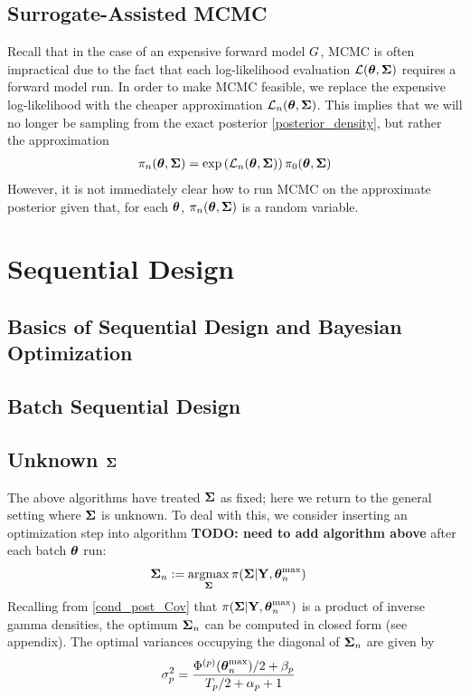 \documentclass[12pt]{article}
\begin{document}
\subsection{Surrogate-Assisted MCMC}
Recall that in the case of an expensive forward model $G$, MCMC is often impractical due to the fact that each log-likelihood evaluation $\mathcal{L}(\boldsymbol{\theta}, \boldsymbol{\Sigma})$ requires a forward model 
 run. In order to make MCMC feasible, we replace the expensive log-likelihood with the cheaper approximation $\mathcal{L}_{n}(\boldsymbol{\theta}, \boldsymbol{\Sigma})$. This implies that we will no longer be 
 sampling from the exact posterior \ref{posterior_density}, but rather the approximation
 \begin{align}
 \pi_{n}(\boldsymbol{\theta}, \boldsymbol{\Sigma}) = \exp\left(\mathcal{L}_{n}(\boldsymbol{\theta}, \boldsymbol{\Sigma})\right)\pi_0(\boldsymbol{\theta}, \boldsymbol{\Sigma}) \label{approx_posterior_density}
 \end{align}
 However, it is not immediately clear how to run MCMC on the approximate posterior given that, for each $\boldsymbol{\theta}$,  $\pi_{n}(\boldsymbol{\theta}, \boldsymbol{\Sigma})$ is a random variable. 

\section{Sequential Design}

\subsection{Basics of Sequential Design and Bayesian Optimization}

\subsection{Batch Sequential Design}

\subsection{Unknown $\boldsymbol{\Sigma}$}
The above algorithms have treated $\boldsymbol{\Sigma}$ as fixed; here we return to the general setting where $\boldsymbol{\Sigma}$ is unknown. To deal with this, we consider inserting an 
optimization step into algorithm \textbf{TODO: need to add algorithm above} after each batch $\boldsymbol{\theta}$ run:
\begin{align}
\boldsymbol{\Sigma}_{n} &:= \operatorname*{argmax}_{\boldsymbol{\Sigma}} \pi(\boldsymbol{\Sigma}|\mathbf{Y}, \boldsymbol{\theta}_{n}^{\text{max}}) \label{Cov_optimization}
\end{align}
Recalling from \ref{cond_post_Cov} that $\pi(\boldsymbol{\Sigma}|\mathbf{Y}, \boldsymbol{\theta}_{n}^{\text{max}})$ is a product of inverse gamma densities, the optimum $\boldsymbol{\Sigma}_{n}$ can 
be computed in closed form (see appendix). The optimal variances occupying the diagonal of $\boldsymbol{\Sigma}_{n}$ are given by 
\begin{align}
\sigma_{p}^2 &= \frac{\Phi^{(p)}(\boldsymbol{\theta}_{n}^{\text{max}})/2 + \beta_{p}}{T_{p}/2 + \alpha_{p} + 1}
\end{align}
\end{document}

